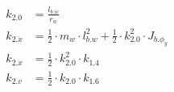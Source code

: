 \documentclass[crop=false,float=true,class=scrreprt]{standalone}
\begin{document}
\vspace{-2em}




\begin{align}
k_{2.0}        &= \displaystyle \frac{l_{b.w}}{r_{w}}                                                                          \\[+1em]
k_{2.\ddot{x}} &= \displaystyle \frac{1}{2} \cdot m_{w} \cdot l_{b.w}^{2} + \frac{1}{2} \cdot k_{2.0}^{2} \cdot J_{b.\phi_{y}} \\[+1em]
k_{2.\dot{x}}  &= \displaystyle \frac{1}{2} \cdot k_{2.0}^{2} \cdot k_{1.4}                                                    \\[+1em]
k_{2.v}        &= \displaystyle \frac{1}{2} \cdot k_{2.0}     \cdot k_{1.6}
\end{align}




\clearpage
\end{document}
